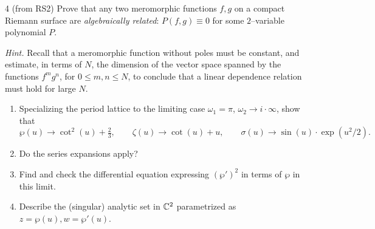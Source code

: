 \documentclass[12pt]{article}  %
\begin{document}
\begin{solution}
\end{solution}

\begin{problem}{4 (from RS2)}
Prove that any two meromorphic functions $f,g$ on a compact Riemann surface are \emph{algebraically related}: $P(f,g)\equiv 0$ for some $2$–variable polynomial $P$.

\emph{Hint.} Recall that a meromorphic function without poles must be constant, and estimate, in terms of $N$, the dimension of the vector space spanned by the functions $f^m g^n$, for $0\le m,n\le N$, to conclude that a linear dependence relation must hold for large $N$.
\end{problem}

\begin{solution}
\end{solution}

\begin{problem}{5}
\begin{enumerate}
  \item Specializing the period lattice to the limiting case $\omega_1 = \pi$, $\omega_2 \to i\cdot\infty$, show that
  \[
    \wp(u) \to \cot^2(u) + \tfrac{2}{3}, \qquad
    \zeta(u) \to \cot(u)+u, \qquad
    \sigma(u) \to \sin(u)\cdot \exp(u^2/2).
  \]
  \item Do the series expansions apply?
  \item Find and check the differential equation expressing $(\wp')^2$ in terms of $\wp$ in this limit.
  \item Describe the (singular) analytic set in $\mathbb{C}^2$ parametrized as $z=\wp(u), w=\wp'(u)$.
\end{enumerate}
\end{problem}

\begin{solution}
\end{solution}
\end{document}
